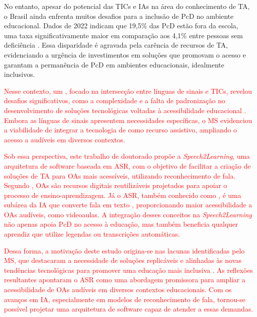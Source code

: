 No entanto, apesar do potencial das TICs e IAs na área do conhecimento de TA, o Brasil ainda enfrenta muitos desafios para a inclusão de PcD no ambiente educacional. Dados de 2022 indicam que 19,5\% das PcD estão fora da escola, uma taxa significativamente maior em comparação aos 4,1\% entre pessoas sem deficiência \cite{IBGE2023}. Essa disparidade é agravada pela carência de recursos de TA, evidenciando a urgência de investimentos em soluções que promovam o acesso e garantam a permanência de PcD em ambientes educacionais, idealmente inclusivos.

\textcolor{red}{Nesse contexto, um , focado na intersecção entre línguas de sinais e TICs, revelou desafios significativos, como a complexidade e a falta de padronização no desenvolvimento de soluções tecnológicas voltadas à acessibilidade educacional \cite{FalvoJr2020_FIE, FalvoJr2020_SBIE, FalvoJr2021_RENOTE}. Embora as línguas de sinais apresentem necessidades específicas, o MS evidenciou a viabilidade de integrar a tecnologia de  como recurso assistivo, ampliando o acesso a  audíveis em diversos contextos.}

\textcolor{red}{Sob essa perspectiva, este trabalho de doutorado propõe a \textit{Speech2Learning}, uma arquitetura de software baseada em ASR, com o objetivo de facilitar a criação de soluções de TA para OAs mais acessíveis, utilizando reconhecimento de fala. Segundo , OAs são recursos digitais reutilizáveis projetados para apoiar o processo de ensino-aprendizagem. Já o ASR, também conhecido como , é uma subárea da IA que converte fala em texto \cite{Jurafsky2024}, proporcionando maior acessibilidade a OAs audíveis, como videoaulas. A integração desses conceitos na \textit{Speech2Learning} não apenas apoia PcD no acesso à educação, mas também beneficia qualquer aprendiz que utilize legendas ou transcrições automáticas.}

\textcolor{red}{Dessa forma, a motivação deste estudo origina-se nas lacunas identificadas pelo MS, que destacaram a necessidade de soluções replicáveis e alinhadas às novas tendências tecnológicas para promover uma educação mais inclusiva \cite{FalvoJr2021_RENOTE}. As reflexões resultantes apontaram o ASR como uma abordagem promissora para ampliar a acessibilidade de OAs audíveis em diversos contextos educacionais. Com os avanços em IA, especialmente em modelos de reconhecimento de fala, tornou-se possível projetar uma arquitetura de software capaz de atender a essas demandas.}

